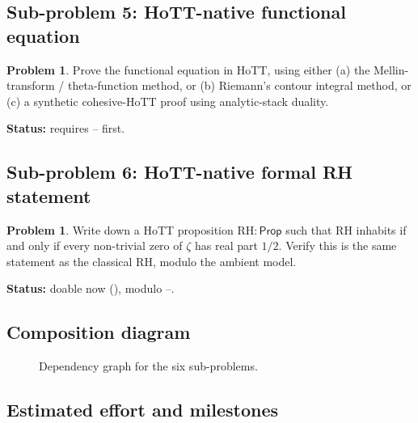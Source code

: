 \documentclass[12pt]{article}
\theoremstyle{definition}
\newtheorem{problem}[theorem]{Problem}
\theoremstyle{remark}
\newcommand{\Prop}{\mathsf{Prop}}
\begin{document}
\subsection*{Sub-problem 5: HoTT-native functional equation}
\begin{problem}\label{prob:5}
Prove the functional equation  in HoTT, using either
(a) the Mellin-transform / theta-function method, or (b) Riemann's contour
integral method, or (c) a synthetic cohesive-HoTT proof using analytic-stack
duality.
\end{problem}
\textbf{Status:} requires -- first.

\subsection*{Sub-problem 6: HoTT-native formal RH statement}
\begin{problem}\label{prob:6}
Write down a HoTT proposition $\mathrm{RH}:\Prop$ such that $\mathrm{RH}$
inhabits if and only if every non-trivial zero of $\zeta$ has real part
$1/2$. Verify this is the same statement as the classical RH, modulo the
ambient model.
\end{problem}
\textbf{Status:} doable now (), modulo --.

\subsection{Composition diagram}

\begin{figure}[htbp]
\centering
{}
\caption{Dependency graph for the six sub-problems.}
\label{fig:roadmap}
\end{figure}

\subsection{Estimated effort and milestones}
\end{document}
